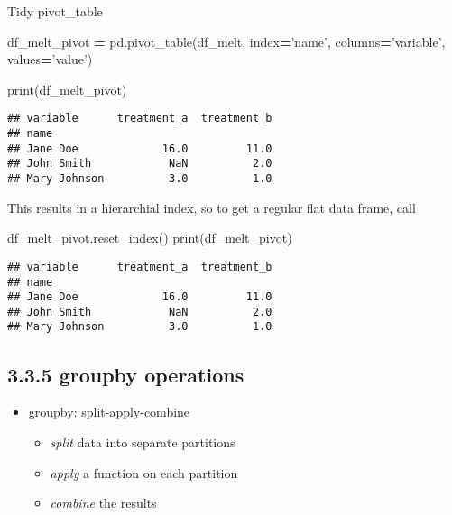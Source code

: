 \documentclass[]{book}
\newenvironment{Shaded}{\begin{snugshade}}{\end{snugshade}}
\newcommand{\BuiltInTok}[1]{#1}
\newcommand{\NormalTok}[1]{#1}
\newcommand{\OperatorTok}[1]{\textcolor[rgb]{0.81,0.36,0.00}{\textbf{#1}}}
\newcommand{\StringTok}[1]{\textcolor[rgb]{0.31,0.60,0.02}{#1}}
\providecommand{\tightlist}{%
  \setlength{\itemsep}{0pt}\setlength{\parskip}{0pt}}
\theoremstyle{definition}
\theoremstyle{definition}
\theoremstyle{definition}
\theoremstyle{remark}
\begin{document}
Tidy pivot\_table

\begin{Shaded}
\begin{Highlighting}[]
\NormalTok{df_melt_pivot }\OperatorTok{=}\NormalTok{ pd.pivot_table(df_melt,}
\NormalTok{                               index}\OperatorTok{=}\StringTok{'name'}\NormalTok{,}
\NormalTok{                               columns}\OperatorTok{=}\StringTok{'variable'}\NormalTok{,}
\NormalTok{                               values}\OperatorTok{=}\StringTok{'value'}\NormalTok{)}
                               
\BuiltInTok{print}\NormalTok{(df_melt_pivot)}
\end{Highlighting}
\end{Shaded}

\begin{verbatim}
## variable      treatment_a  treatment_b
## name                                  
## Jane Doe             16.0         11.0
## John Smith            NaN          2.0
## Mary Johnson          3.0          1.0
\end{verbatim}

This results in a hierarchial index, so to get a regular flat data
frame, call

\begin{Shaded}
\begin{Highlighting}[]
\NormalTok{df_melt_pivot.reset_index()}
\BuiltInTok{print}\NormalTok{(df_melt_pivot)}
\end{Highlighting}
\end{Shaded}

\begin{verbatim}
## variable      treatment_a  treatment_b
## name                                  
## Jane Doe             16.0         11.0
## John Smith            NaN          2.0
## Mary Johnson          3.0          1.0
\end{verbatim}

\hypertarget{groupby-operations}{%
\subsection{3.3.5 groupby operations}\label{groupby-operations}}

\begin{itemize}
\tightlist
\item
  groupby: split-apply-combine

  \begin{itemize}
  \tightlist
  \item
    \emph{split} data into separate partitions
  \item
    \emph{apply} a function on each partition
  \item
    \emph{combine} the results
  \end{itemize}
\end{itemize}
\end{document}
